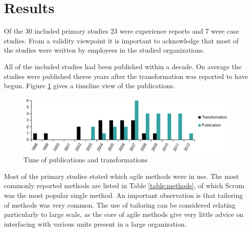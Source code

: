 \documentclass[lnbip]{svmultln}
\begin{document}
%
%


\section{Results}
\label{sec:results}

Of the 30 included primary studies 23 were experience reports and 7 were case
studies. From a validity viewpoint it is important to acknowledge that most of
the studies were written by employees in the studied organizations.

All of the included studies had been published within a decade. On average the
studies were published theree years after the transformation was reported to
have begun. Figure \ref{fig:publications} gives a timeline view of the
publications.

\begin{figure}[htb]
  \begin{center}
    \includegraphics[width=1\textwidth]{publicationschart.pdf}
    \caption{Time of publications and transformations}
    \label{fig:publications}
  \end{center}
\end{figure}


Most of the primary studies stated which agile methods were in use. The most
commonly reported methods are listed in Table \ref{table:methods}, of which
Scrum was the most popular single method. An important observation is that
tailoring of methods was very common. The use of tailoring can be considered
relating particularly to large scale, as the core of agile methods give very
little advice on interfacing with various units present in a large organization.
\end{document}
